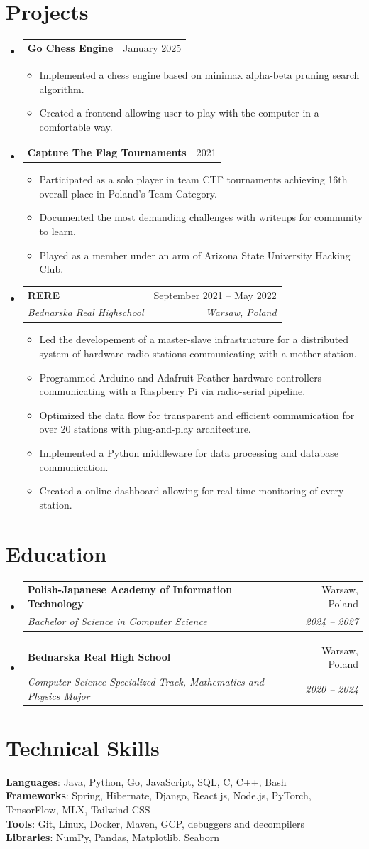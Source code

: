 \documentclass[letterpaper,11pt]{article}
\makeatletter
\newcommand{\resumeItem}[1]{
  \item\small{
    {#1 \vspace{-2pt}}
  }
}
\newcommand{\resumeSubheading}[4]{
  \vspace{-2pt}\item
    \begin{tabular*}{0.97\textwidth}[t]{l@{\extracolsep{\fill}}r}
      \textbf{#1} & #2 \\
      \textit{\small#3} & \textit{\small #4} \\
    \end{tabular*}\vspace{-7pt}
}
\newcommand{\resumeSubheadingNoDate}[2]{
  \vspace{-2pt}\item
    \begin{tabular*}{0.97\textwidth}[t]{l@{\extracolsep{\fill}}r}
      \textbf{#1} & #2 \\
    \end{tabular*}\vspace{-7pt}
}
\newcommand{\resumeSubHeadingListStart}{\begin{itemize}[leftmargin=0.15in, label={}]}
\newcommand{\resumeSubHeadingListEnd}{\end{itemize}}
\newcommand{\resumeItemListStart}{\begin{itemize}}
\newcommand{\resumeItemListEnd}{\end{itemize}\vspace{-5pt}}
\makeatother
\begin{document}
\section{Projects}
  \resumeSubHeadingListStart
    \resumeSubheadingNoDate
      {Go Chess Engine}{January 2025}
      \resumeItemListStart
        \resumeItem{Implemented a chess engine based on minimax alpha-beta pruning search algorithm.}
        \resumeItem{Created a frontend allowing user to play with the computer in a comfortable way.}
      \resumeItemListEnd
    \resumeSubheadingNoDate
      {Capture The Flag Tournaments}{2021}
      \resumeItemListStart
        \resumeItem{Participated as a solo player in team CTF tournaments achieving 16th overall place in Poland's Team Category.}
        \resumeItem{Documented the most demanding challenges with writeups for community to learn.}
        \resumeItem{Played as a member under an arm of Arizona State University Hacking Club.}
      \resumeItemListEnd
    \resumeSubheading
      {RERE}{September 2021 -- May 2022}
      {Bednarska Real Highschool}{Warsaw, Poland}
      \resumeItemListStart
        \resumeItem{Led the developement of a master-slave infrastructure for a distributed system of hardware radio stations communicating with a mother station.}
        \resumeItem{Programmed Arduino and Adafruit Feather hardware controllers communicating with a Raspberry Pi via radio-serial pipeline.}
        \resumeItem{Optimized the data flow for transparent and efficient communication for over 20 stations with plug-and-play architecture.}
        \resumeItem{Implemented a Python middleware for data processing and database communication.}
        \resumeItem{Created a online dashboard allowing for real-time monitoring of every station.}
      \resumeItemListEnd
  \resumeSubHeadingListEnd

\section{Education}
    \resumeSubHeadingListStart
      \resumeSubheading
        {Polish-Japanese Academy of Information Technology}{Warsaw, Poland}
        {Bachelor of Science in Computer Science}{2024 -- 2027}
      \resumeSubheading
        {Bednarska Real High School}{Warsaw, Poland}
        {Computer Science Specialized Track, Mathematics and Physics Major}{2020 -- 2024}
  \resumeSubHeadingListEnd


\section{Technical Skills}
  \begin{itemize}[leftmargin=0.15in, label={}]
    \small{\item{
      \textbf{Languages}{: Java, Python, Go, JavaScript, SQL, C, C++, Bash} \\
      \textbf{Frameworks}{: Spring, Hibernate, Django, React.js, Node.js, PyTorch, TensorFlow, MLX, Tailwind CSS} \\
      \textbf{Tools}{: Git, Linux, Docker, Maven,  GCP, debuggers and decompilers} \\
      \textbf{Libraries}{: NumPy, Pandas, Matplotlib, Seaborn} \\
    }}
  \end{itemize}
\end{document}
